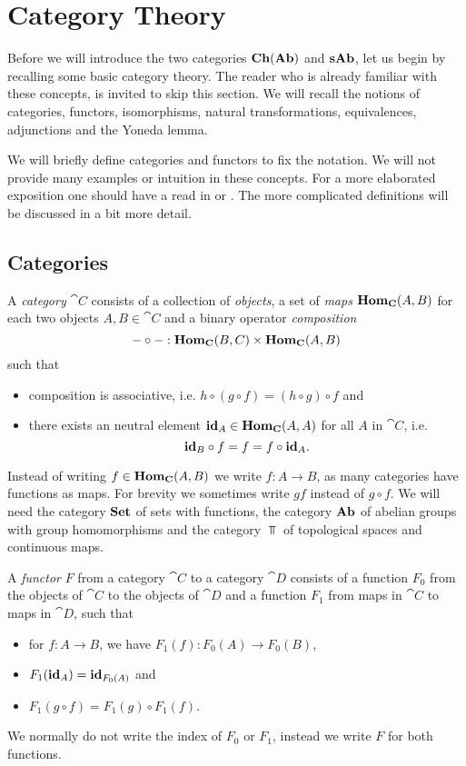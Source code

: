 \section{Category Theory}
\label{sec:Category Theory}
Before we will introduce the two categories $\mathbf{Ch}(\mathbf{Ab})$ and $\mathbf{sAb}$, let us begin by recalling some basic category theory. The reader who is already familiar with these concepts, is invited to skip this section. We will recall the notions of categories, functors, isomorphisms, natural transformations, equivalences, adjunctions and the Yoneda lemma.

We will briefly define categories and functors to fix the notation. We will not provide many examples or intuition in these concepts. For a more elaborated exposition one should have a read in \cite{awodey} or \cite{maclane}. The more complicated definitions will be discussed in a bit more detail.

\subsection{Categories}
\begin{definition}
	A \emph{category} $\cat{C}$ consists of a collection of \emph{objects}, a set of \emph{maps} $\mathbf{Hom}_{\mathbf{C}}(A, B)$ for each two objects $A, B \in \cat{C}$ and a binary operator \emph{composition} 
	$$-\circ-:\mathbf{Hom}_{\mathbf{C}}(B, C) \times \mathbf{Hom}_{\mathbf{C}}(A, B)$$
	such that
	\begin{itemize}
		\item composition is associative, i.e. $h \circ (g \circ f) = (h \circ g) \circ f$ and
		\item there exists an neutral element $\mathbf{id}_A \in \mathbf{Hom}_{\mathbf{C}}(A, A)$ for all $A$ in $\cat{C}$, i.e.
		$$ \mathbf{id}_B \circ f = f = f \circ \mathbf{id}_A. $$
	\end{itemize}
\end{definition}

Instead of writing $f \in \mathbf{Hom}_{\mathbf{C}}(A, B)$ we write $f: A \to B$, as many categories have functions as maps. For brevity we sometimes write $gf$ instead of $g \circ f$. We will need the category $\mathbf{Set}$ of sets with functions, the category $\mathbf{Ab}$ of abelian groups with group homomorphisms and the category $\Top$ of topological spaces and continuous maps.

\begin{definition}
	A \emph{functor} $F$ from a category $\cat{C}$ to a category $\cat{D}$ consists of a function $F_0$ from the objects of $\cat{C}$ to the objects of $\cat{D}$ and a function $F_1$ from maps in $\cat{C}$ to maps in $\cat{D}$, such that
	\begin{itemize}
		\item for $f: A \to B$, we have $F_1(f): F_0(A) \to F_0(B)$,
		\item $F_1(\mathbf{id}_A) = \mathbf{id}_{F_0(A)}$ and
		\item $F_1(g \circ f) = F_1(g) \circ F_1(f)$.
	\end{itemize}
	We normally do not write the index of $F_0$ or $F_1$, instead we write $F$ for both functions.
\end{definition}

